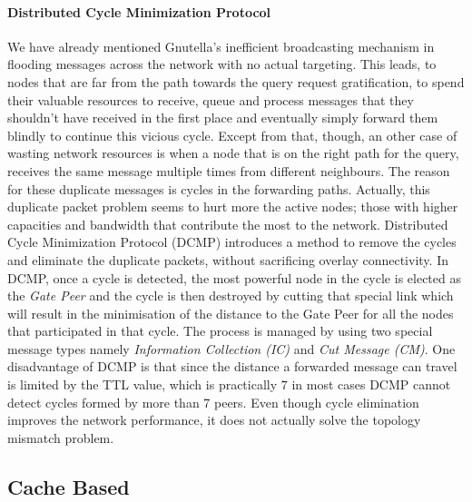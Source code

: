 \paragraph*{\bf Distributed Cycle Minimization Protocol}
We have already mentioned Gnutella's inefficient broadcasting mechanism in
flooding messages across the network with no actual targeting. This leads, to
nodes that are far from the path towards the query request gratification, to
spend their valuable resources to receive, queue and process messages that they
shouldn't have received in the first place and eventually simply forward them
blindly to continue this vicious cycle. Except from that, though, an other case
of wasting network resources is when a node that is on the right path for the
query, receives the same message multiple times from different neighbours. The
reason for these duplicate messages is cycles in the forwarding paths. Actually,
this duplicate packet problem seems to hurt more the active nodes; those with
higher capacities and bandwidth that contribute the most to the network.
Distributed Cycle Minimization Protocol (DCMP) \cite{zhu_dcmp_2008} introduces a
method to
remove the cycles and eliminate the duplicate packets, without sacrificing
overlay connectivity. In DCMP, once a cycle is detected, the most powerful node
in the cycle is elected as the \emph{Gate Peer} and the cycle is then destroyed
by cutting that special link which will result in the minimisation of the
distance to the Gate Peer for all the nodes that participated in that cycle. The
process is managed by using two special message types namely \emph{Information
Collection (IC)} and \emph{Cut Message (CM)}. One disadvantage of DCMP is that
since the distance a forwarded message can travel is limited by the TTL value,
which is practically $7$ in most cases DCMP cannot detect cycles formed by more
than 7 peers. Even though cycle elimination improves the network performance, it
does not actually solve the topology mismatch problem.

\subsection{Cache Based}


